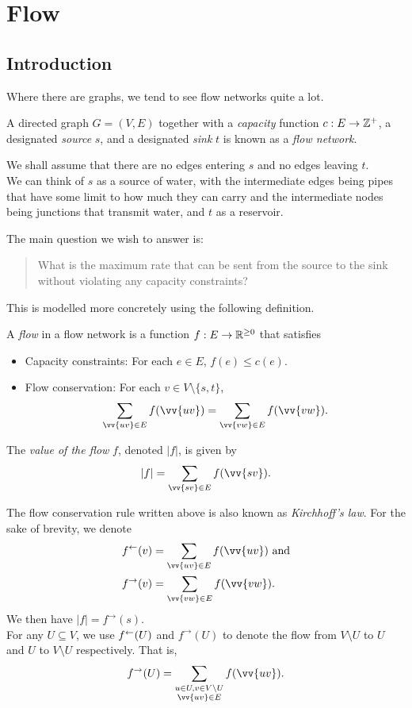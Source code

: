 \section{Flow}

\subsection{Introduction}

Where there are graphs, we tend to see flow networks quite a lot.

\begin{fdef}
	A directed graph $G=(V,E)$ together with a \textit{capacity} function $c:E\to\mathbb{Z}^+$, a designated \textit{source} $s$, and a designated \textit{sink} $t$ is known as a \textit{flow network}.
\end{fdef}

We shall assume that there are no edges entering $s$ and no edges leaving $t$.\\
We can think of $s$ as a source of water, with the intermediate edges being pipes that have some limit to how much they can carry and the intermediate nodes being junctions that transmit water, and $t$ as a reservoir.

The main question we wish to answer is:
\begin{quote}
	What is the maximum rate that can be sent from the source to the sink without violating any capacity constraints?
\end{quote}

This is modelled more concretely using the following definition.

\begin{fdef}[Flow]
	A \textit{flow} in a flow network is a function $f:E\to\mathbb{R}^{\geq 0}$ that satisfies
	\begin{itemize}
		\item Capacity constraints: For each $e\in E$, $f(e)\leq c(e)$.
		\item Flow conservation: For each $v\in V\setminus\{s,t\}$,
		\[ \sum_{\vv{uv}\in E} f(\vv{uv}) = \sum_{\vv{vw}\in E} f(\vv{vw}). \]
	\end{itemize}
	The \textit{value of the flow} $f$, denoted $|f|$, is given by
	\[ |f| = \sum_{\vv{sv}\in E} f(\vv{sv}). \]
\end{fdef}

The flow conservation rule written above is also known as \textit{Kirchhoff's law}. For the sake of brevity, we denote
\begin{align*}
	f^{\ot}(v) &= \sum_{\vv{uv}\in E} f(\vv{uv}) \text{ and} \\
	f^{\to}(v) &= \sum_{\vv{vw}\in E} f(\vv{vw}).
\end{align*}
We then have $|f|=f^{\to}(s)$.\\
For any $U\subseteq V$, we use $f^{\leftarrow}(U)$ and $f^{\to}(U)$ to denote the flow from $V\setminus U$ to $U$ and $U$ to $V\setminus U$ respectively. That is,
\[ f^\to(U) = \sum_{\substack{u\in U, v\in V\setminus U \\ \vv{uv}\in E}} f(\vv{uv}). \]

